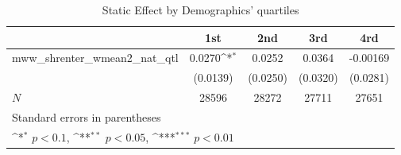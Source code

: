 \begin{table}[htbp]\centering
\def\sym#1{\ifmmode^{#1}\else\(^{#1}\)\fi}
\caption{Static Effect by Demographics' quartiles}
\begin{tabular}{l*{4}{c}}
\hline\hline
            &\multicolumn{1}{c}{1st}&\multicolumn{1}{c}{2nd}&\multicolumn{1}{c}{3rd}&\multicolumn{1}{c}{4rd}\\
\hline
mww\_shrenter\_wmean2\_nat\_qtl&      0.0270\sym{*}  &      0.0252         &      0.0364         &    -0.00169         \\
            &    (0.0139)         &    (0.0250)         &    (0.0320)         &    (0.0281)         \\
\hline
\(N\)       &       28596         &       28272         &       27711         &       27651         \\
\hline\hline
\multicolumn{5}{l}{\footnotesize Standard errors in parentheses}\\
\multicolumn{5}{l}{\footnotesize \sym{*} \(p<0.1\), \sym{**} \(p<0.05\), \sym{***} \(p<0.01\)}\\
\end{tabular}
\end{table}
